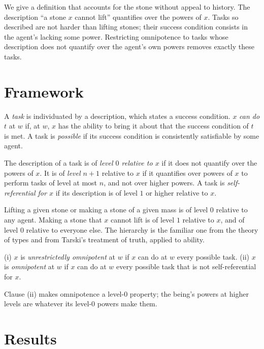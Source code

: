 \documentclass{situationist-preprint}
\begin{document}
We give a definition that accounts for the stone without appeal to history. The description \enquote{a stone $x$ cannot lift} quantifies over the powers of $x$. Tasks so described are not harder than lifting stones; their success condition consists in the agent's lacking some power. Restricting omnipotence to tasks whose description does not quantify over the agent's own powers removes exactly these tasks.

\section{Framework}

\begin{definition}\label{d:ability}
A \emph{task} is individuated by a description, which states a success condition. $x$ \emph{can do} $t$ at $w$ if, at $w$, $x$ has the ability to bring it about that the success condition of $t$ is met. A task is \emph{possible} if its success condition is consistently satisfiable by some agent.
\end{definition}

\begin{definition}\label{d:level}
The description of a task is of \emph{level $0$ relative to $x$} if it does not quantify over the powers of $x$. It is of \emph{level $n+1$} relative to $x$ if it quantifies over powers of $x$ to perform tasks of level at most $n$, and not over higher powers. A task is \emph{self-referential for $x$} if its description is of level $1$ or higher relative to $x$.
\end{definition}

Lifting a given stone or making a stone of a given mass is of level $0$ relative to any agent. Making a stone that $x$ cannot lift is of level $1$ relative to $x$, and of level $0$ relative to everyone else. The hierarchy is the familiar one from the theory of types and from Tarski's treatment of truth, applied to ability.

\begin{definition}\label{d:omni}
(i) $x$ is \emph{unrestrictedly omnipotent} at $w$ if $x$ can do at $w$ every possible task. (ii) $x$ is \emph{omnipotent} at $w$ if $x$ can do at $w$ every possible task that is not self-referential for $x$.
\end{definition}

Clause (ii) makes omnipotence a level-$0$ property; the being's powers at higher levels are whatever its level-$0$ powers make them.

\section{Results}
\end{document}
